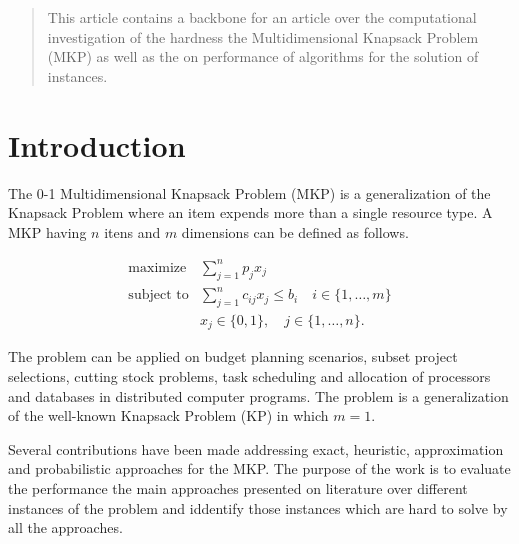 \documentclass{article}
\author{Marcos Daniel Baroni}
\begin{document}
%
%

\begin{abstract}
This article contains a backbone for an article over the computational
investigation of the hardness the Multidimensional Knapsack
Problem (MKP) as well as the on performance of algorithms for the solution of
instances.
\end{abstract}

\section{Introduction}
\label{intro}


The 0-1 Multidimensional Knapsack Problem (MKP) is a generalization of the Knapsack
Problem where an item expends more than a single resource type.
A MKP having $n$ itens and $m$ dimensions can be defined as follows.

\begin{align*}
  \text{maximize} & \sum_{j=1}^n p_j x_j \\
  \text{subject to} & \sum_{j=1}^n c_{ij} x_j \leq b_i \quad i \in \{1, \ldots, m\}\\
   & x_j \in \{0, 1\}, \quad j \in \{1, \ldots, n\}.
\end{align*}

The problem can be applied on budget planning scenarios, subset project
selections, cutting stock problems, task scheduling and allocation of processors
and databases in distributed computer programs.
The problem is a generalization of the well-known Knapsack Problem (KP) in which
$ m = 1$.

Several contributions have been made addressing exact, heuristic, approximation
and probabilistic approaches for the MKP.
The purpose of the work is to evaluate the performance the main approaches
presented on literature over different instances of the problem and
iddentify those instances which are hard to solve by all the approaches.
\end{document}
